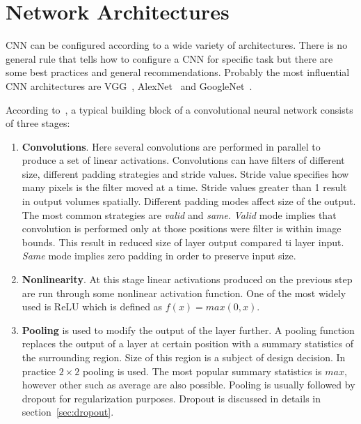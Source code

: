 \documentclass[a4paper, 11pt, table]{article}
\begin{document}
\section{Network Architectures}

CNN can be configured according to a wide variety of architectures. There is no general rule that tells how to configure a CNN for specific task but there are some best practices and general recommendations. Probably the most influential CNN architectures are VGG~\cite{DBLP:journals/corr/SimonyanZ14a}, AlexNet~\cite{NIPS2012_4824} and GoogleNet~\cite{DBLP:journals/corr/SzegedyLJSRAEVR14}.

According to~\cite{dl_book}, a typical building block of a convolutional neural network consists of three stages:
\begin{enumerate}
\item \textbf{Convolutions}. Here several convolutions are performed in parallel to produce a set of linear activations. Convolutions can have filters of different size, different padding strategies and stride values. Stride value specifies how many pixels is the filter moved at a time. Stride values greater than 1 result in output volumes spatially. Different padding modes affect size of the output. The most common strategies are \textit{valid} and \textit{same}. \textit{Valid} mode implies that convolution is performed only at those positions were filter is within image bounds. This result in reduced size of layer output compared ti layer input. \textit{Same} mode implies zero padding in order to preserve input size. 

\item \textbf{Nonlinearity}. At this stage linear activations produced on the previous step are run through some nonlinear activation function. One of the most widely used is ReLU which is defined as $f(x) = max(0, x)$.
 
\item \textbf{Pooling} is used to modify the output of the layer further. A pooling function replaces the output of a layer at certain position with a summary statistics of the surrounding region. Size of this region is a subject of design decision. In practice $2 \times 2$ pooling is used. The most popular summary statistics is $max$, however other such as average are also possible. Pooling is usually followed by dropout for regularization purposes. Dropout is discussed in details in section~\ref{sec:dropout}.
\end{enumerate}
\end{document}
